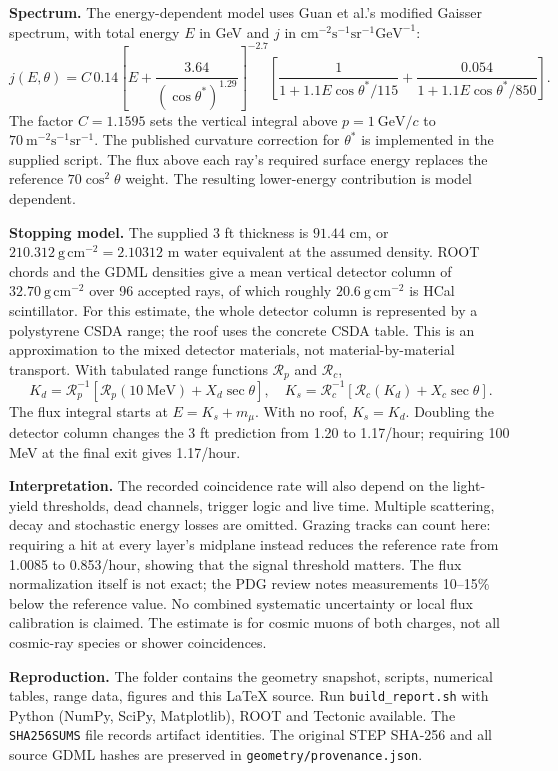 \documentclass[10pt,letterpaper]{article}
\begin{document}
\textbf{Spectrum.} The energy-dependent model uses Guan et al.'s modified Gaisser spectrum\cite{guan}, with total energy $E$ in GeV and $j$ in $\mathrm{cm^{-2}s^{-1}sr^{-1}GeV^{-1}}$:
\[
j(E,\theta)=C\,0.14\left[E+\frac{3.64}{(\cos\theta^*)^{1.29}}\right]^{-2.7}
\left[\frac{1}{1+1.1E\cos\theta^*/115}+\frac{0.054}{1+1.1E\cos\theta^*/850}\right].
\]
The factor $C=1.1595$ sets the vertical integral above $p=1\ \mathrm{GeV}/c$ to $70\ \mathrm{m^{-2}s^{-1}sr^{-1}}$. The published curvature correction for $\theta^*$ is implemented in the supplied script. The flux above each ray's required surface energy replaces the reference $70\cos^2\theta$ weight. The resulting lower-energy contribution is model dependent.

\textbf{Stopping model.} The supplied 3 ft thickness is $91.44$ cm, or $210.312\ \mathrm{g\,cm^{-2}}=2.10312$ m water equivalent at the assumed density. ROOT chords and the GDML densities give a mean vertical detector column of $32.70\ \mathrm{g\,cm^{-2}}$ over 96 accepted rays, of which roughly $20.6\ \mathrm{g\,cm^{-2}}$ is HCal scintillator. For this estimate, the whole detector column is represented by a polystyrene CSDA range\cite{poly}; the roof uses the concrete CSDA table\cite{concrete}. This is an approximation to the mixed detector materials, not material-by-material transport. With tabulated range functions $\mathcal R_p$ and $\mathcal R_c$,
\[
K_d=\mathcal R_p^{-1}\!\left[\mathcal R_p(10\ \mathrm{MeV})+X_d\sec\theta\right],\quad
K_s=\mathcal R_c^{-1}\!\left[\mathcal R_c(K_d)+X_c\sec\theta\right].
\]
The flux integral starts at $E=K_s+m_\mu$. With no roof, $K_s=K_d$. Doubling the detector column changes the 3 ft prediction from 1.20 to 1.17/hour; requiring 100 MeV at the final exit gives 1.17/hour.

\textbf{Interpretation.} The recorded coincidence rate will also depend on the light-yield thresholds, dead channels, trigger logic and live time. Multiple scattering, decay and stochastic energy losses are omitted. Grazing tracks can count here: requiring a hit at every layer's midplane instead reduces the reference rate from 1.0085 to 0.853/hour, showing that the signal threshold matters. The flux normalization itself is not exact; the PDG review notes measurements 10--15\% below the reference value\cite{pdg}. No combined systematic uncertainty or local flux calibration is claimed. The estimate is for cosmic muons of both charges, not all cosmic-ray species or shower coincidences.

\textbf{Reproduction.} The folder contains the geometry snapshot, scripts, numerical tables, range data, figures and this \LaTeX{} source. Run \texttt{build\_report.sh} with Python (NumPy, SciPy, Matplotlib), ROOT and Tectonic available. The \texttt{SHA256SUMS} file records artifact identities. The original STEP SHA-256 and all source GDML hashes are preserved in \texttt{geometry/provenance.json}.
\end{document}
